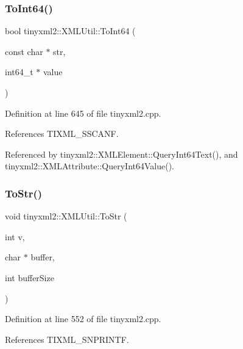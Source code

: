 \mbox{\label{classtinyxml2_1_1_x_m_l_util_afe2ea09257431cd2b4b6d440552e4195}} 
\subsubsection{To\+Int64()}
{\footnotesize\ttfamily bool tinyxml2\+::\+X\+M\+L\+Util\+::\+To\+Int64 (\begin{DoxyParamCaption}\item[{const char $\ast$}]{str,  }\item[{int64\+\_\+t $\ast$}]{value }\end{DoxyParamCaption})\hspace{0.3cm}{\ttfamily [static]}}



Definition at line 645 of file tinyxml2.\+cpp.



References T\+I\+X\+M\+L\+\_\+\+S\+S\+C\+A\+NF.



Referenced by tinyxml2\+::\+X\+M\+L\+Element\+::\+Query\+Int64\+Text(), and tinyxml2\+::\+X\+M\+L\+Attribute\+::\+Query\+Int64\+Value().

\mbox{\label{classtinyxml2_1_1_x_m_l_util_a3cd6c703d49b9d51bdf0f4ff6aa021c7}} 
\subsubsection{To\+Str()\hspace{0.1cm}{\footnotesize\ttfamily [1/6]}}
{\footnotesize\ttfamily void tinyxml2\+::\+X\+M\+L\+Util\+::\+To\+Str (\begin{DoxyParamCaption}\item[{int}]{v,  }\item[{char $\ast$}]{buffer,  }\item[{int}]{buffer\+Size }\end{DoxyParamCaption})\hspace{0.3cm}{\ttfamily [static]}}



Definition at line 552 of file tinyxml2.\+cpp.



References T\+I\+X\+M\+L\+\_\+\+S\+N\+P\+R\+I\+N\+TF.



